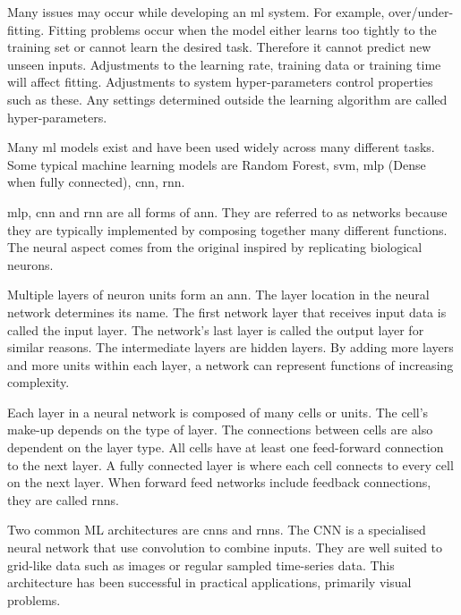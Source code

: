 Many issues may occur while developing an \acrshort{ml} system. For example, over/under-fitting. Fitting problems occur when the model either learns too tightly to the training set or cannot learn the desired task. Therefore it cannot predict new unseen inputs. Adjustments to the learning rate, training data or training time will affect fitting. Adjustments to system hyper-parameters control properties such as these. Any settings determined outside the learning algorithm are called hyper-parameters.\cite{Goodfellow2015}

Many \acrshort{ml} models exist and have been used widely across many different tasks. Some typical machine learning models are Random Forest, \acrfull{svm}, \acrfull{mlp} (Dense when fully connected), \acrfull{cnn}, \acrfull{rnn}.

\acrshort{mlp}, \acrshort{cnn} and \acrshort{rnn} are all forms of \acrfull{ann}. They are referred to as networks because they are typically implemented by composing together many different functions. The neural aspect comes from the original inspired by replicating biological neurons.

Multiple layers of neuron units form an \acrshort{ann}. The layer location in the neural network determines its name. The first network layer that receives input data is called the input layer. The network's last layer is called the output layer for similar reasons. The intermediate layers are hidden layers. By adding more layers and more units within each layer, a network can represent functions of increasing complexity\cite{Goodfellow2015}.

Each layer in a neural network is composed of many cells or units. The cell's make-up depends on the type of layer. The connections between cells are also dependent on the layer type. All cells have at least one feed-forward connection to the next layer. A fully connected layer is where each cell connects to every cell on the next layer. When forward feed networks include feedback connections, they are called \acrshort{rnn}s.

Two common ML architectures are \acrshort{cnn}s and \acrshort{rnn}s. The CNN is a specialised neural network that use convolution to combine inputs. They are well suited to grid-like data such as images or regular sampled time-series data. This architecture has been successful in practical applications, primarily visual problems.\cite{Goodfellow2015}

